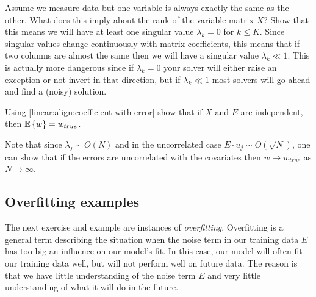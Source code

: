 \begin{exercise}
  Assume we measure data but one variable is always exactly the same as the other.  What does this imply about the rank of the variable matrix $X$?  Show that this means we will have at least one singular value $\lambda_k=0$ for $k\leq K$.  Since singular values change continuously with matrix coefficients, this means that if two columns are almost the same then we will have a singular value $\lambda_k\ll1$.  This is actually more dangerous since if $\lambda_k=0$ your solver will either raise an exception or not invert in that direction, but if $\lambda_k\ll1$ most solvers will go ahead and find a (noisy) solution.
\end{exercise}

\begin{exercise}
  Using \eqref{linear:align:coefficient-with-error} show that if $X$ and $E$ are independent, then $\mathbb{E}\left\{ w \right\} = w_{true}$.

  Note that since $\lambda_j\sim O(N)$ and in the uncorrelated case $E\cdot u_j\sim O(\sqrt{N})$, one can show that if the errors are uncorrelated with the covariates then $w\to w_{true}$ as $N\to\infty$.
\end{exercise}

\subsection{Overfitting examples}
The next exercise and example are instances of \emph{overfitting}.  Overfitting is a general term describing the situation when the noise term in our training data $E$ has too big an influence on our model's fit.  In this case, our model will often fit our training data well, but will not perform well on future data.  The reason is that we have little understanding of the noise term $E$ and very little understanding of what it will do in the future.  

